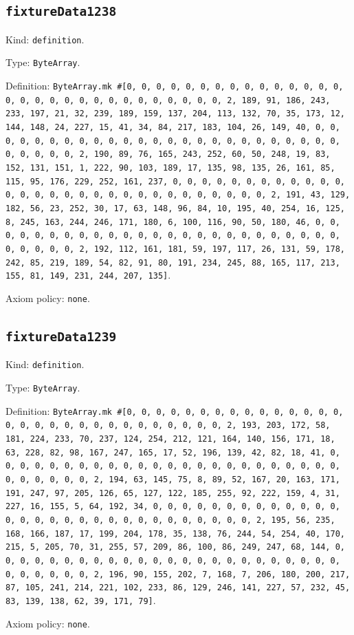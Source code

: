 \documentclass[11pt]{article}
\begin{document}
\subsection*{\texttt{fixtureData1238}}
\noindent Kind: \texttt{definition}.\par
\noindent Type: \texttt{ByteArray}.\par
\noindent Definition: \texttt{ByteArray.mk \#[0, 0, 0, 0, 0, 0, 0, 0, 0, 0, 0, 0, 0, 0, 0, 0, 0, 0, 0, 0, 0, 0, 0, 0, 0, 0, 0, 0, 0, 0, 2, 189, 91, 186, 243, 233, 197, 21, 32, 239, 189, 159, 137, 204, 113, 132, 70, 35, 173, 12, 144, 148, 24, 227, 15, 41, 34, 84, 217, 183, 104, 26, 149, 40, 0, 0, 0, 0, 0, 0, 0, 0, 0, 0, 0, 0, 0, 0, 0, 0, 0, 0, 0, 0, 0, 0, 0, 0, 0, 0, 0, 0, 0, 0, 2, 190, 89, 76, 165, 243, 252, 60, 50, 248, 19, 83, 152, 131, 151, 1, 222, 90, 103, 189, 17, 135, 98, 135, 26, 161, 85, 115, 95, 176, 229, 252, 161, 237, 0, 0, 0, 0, 0, 0, 0, 0, 0, 0, 0, 0, 0, 0, 0, 0, 0, 0, 0, 0, 0, 0, 0, 0, 0, 0, 0, 0, 0, 0, 2, 191, 43, 129, 182, 56, 23, 252, 30, 17, 63, 148, 96, 84, 10, 195, 40, 254, 16, 125, 8, 245, 163, 244, 246, 171, 180, 6, 100, 116, 90, 50, 180, 46, 0, 0, 0, 0, 0, 0, 0, 0, 0, 0, 0, 0, 0, 0, 0, 0, 0, 0, 0, 0, 0, 0, 0, 0, 0, 0, 0, 0, 0, 0, 2, 192, 112, 161, 181, 59, 197, 117, 26, 131, 59, 178, 242, 85, 219, 189, 54, 82, 91, 80, 191, 234, 245, 88, 165, 117, 213, 155, 81, 149, 231, 244, 207, 135]}.\par
\noindent Axiom policy: \texttt{none}.\par
\subsection*{\texttt{fixtureData1239}}
\noindent Kind: \texttt{definition}.\par
\noindent Type: \texttt{ByteArray}.\par
\noindent Definition: \texttt{ByteArray.mk \#[0, 0, 0, 0, 0, 0, 0, 0, 0, 0, 0, 0, 0, 0, 0, 0, 0, 0, 0, 0, 0, 0, 0, 0, 0, 0, 0, 0, 0, 0, 2, 193, 203, 172, 58, 181, 224, 233, 70, 237, 124, 254, 212, 121, 164, 140, 156, 171, 18, 63, 228, 82, 98, 167, 247, 165, 17, 52, 196, 139, 42, 82, 18, 41, 0, 0, 0, 0, 0, 0, 0, 0, 0, 0, 0, 0, 0, 0, 0, 0, 0, 0, 0, 0, 0, 0, 0, 0, 0, 0, 0, 0, 0, 0, 2, 194, 63, 145, 75, 8, 89, 52, 167, 20, 163, 171, 191, 247, 97, 205, 126, 65, 127, 122, 185, 255, 92, 222, 159, 4, 31, 227, 16, 155, 5, 64, 192, 34, 0, 0, 0, 0, 0, 0, 0, 0, 0, 0, 0, 0, 0, 0, 0, 0, 0, 0, 0, 0, 0, 0, 0, 0, 0, 0, 0, 0, 0, 0, 2, 195, 56, 235, 168, 166, 187, 17, 199, 204, 178, 35, 138, 76, 244, 54, 254, 40, 170, 215, 5, 205, 70, 31, 255, 57, 209, 86, 100, 86, 249, 247, 68, 144, 0, 0, 0, 0, 0, 0, 0, 0, 0, 0, 0, 0, 0, 0, 0, 0, 0, 0, 0, 0, 0, 0, 0, 0, 0, 0, 0, 0, 0, 0, 2, 196, 90, 155, 202, 7, 168, 7, 206, 180, 200, 217, 87, 105, 241, 214, 221, 102, 233, 86, 129, 246, 141, 227, 57, 232, 45, 83, 139, 138, 62, 39, 171, 79]}.\par
\noindent Axiom policy: \texttt{none}.\par
\end{document}
